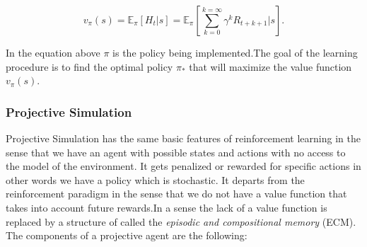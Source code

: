 \documentclass[twocolumn,prX,longbibliography]{revtex4}
\begin{document}
\begin{equation}
 v_{\pi}(s) = \mathbb{E}_{\pi}[H_t|s]=  \mathbb{E}_{\pi}[\sum_{k=0}^{k= \infty} \gamma^k R_{t+k+1}|s].
\end{equation}

In the equation above \(\pi\) is the policy being implemented.The goal of the learning procedure is to find the optimal policy \( \pi_{*} \) that will maximize the value function \(v_{\pi}(s)\).

\subsubsection*{Projective Simulation}
Projective Simulation has the same basic features of reinforcement learning in the sense that we have an agent with possible states and actions with no access to the model of the environment. It gets penalized or rewarded for specific actions in other words we have a policy which is stochastic. It departs from the reinforcement paradigm in the sense that we do not have a value function that takes into account future rewards.In a sense the lack of a value function is replaced by a structure of called the \textit{episodic and compositional memory} (ECM). The components of a projective agent are the following:
\end{document}
